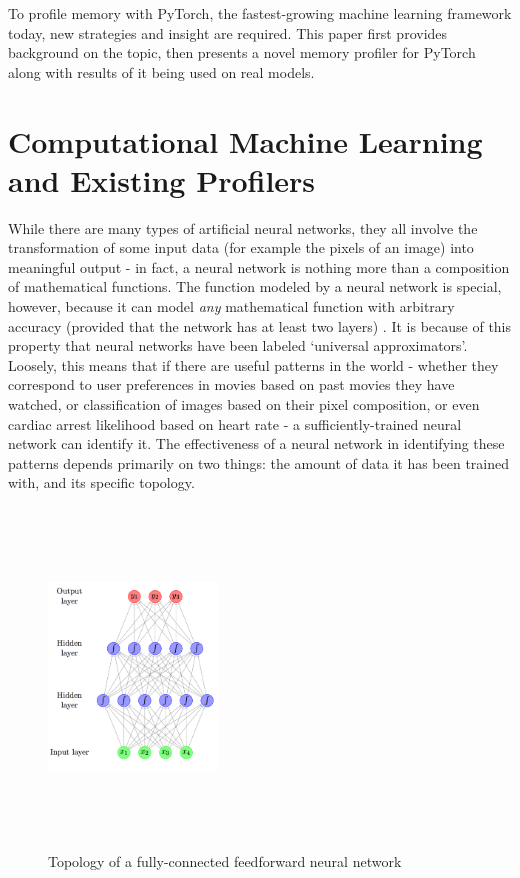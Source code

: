 \documentclass[12pt,letterpaper]{article}
\begin{document}
To profile memory with PyTorch, the fastest-growing machine learning framework today, new strategies and insight are required. This paper first provides background on the topic, then presents a novel memory profiler for PyTorch along with results of it being used on real models. \par 
\newpage

\section{Computational Machine Learning and Existing Profilers}
While there are many types of artificial neural networks, they all involve the transformation of some input data (for example the pixels of an image) into meaningful output - in fact, a neural network is nothing more than a composition of mathematical functions. The function modeled by a neural network is special, however, because it can model \textit{any} mathematical function with arbitrary accuracy (provided that the network has at least two layers) \cite{dnn_history}. It is because of this property that neural networks have been labeled \enquote*{universal approximators}. Loosely, this means that if there are useful patterns in the world - whether they correspond to user preferences in movies based on past movies they have watched, or classification of images based on their pixel composition, or even cardiac arrest likelihood based on heart rate - a sufficiently-trained neural network can identify it. The effectiveness of a neural network in identifying these patterns depends primarily on two things: the amount of data it has been trained with, and its specific topology.
\par

\begin{figure}[h]
\centering
\includegraphics[width=0.4\textwidth,height=9cm]{neural_network_machinelearningmastery.png}
\captionsetup{width=0.7\linewidth}
\caption{ Topology of a fully-connected feedforward neural network \cite{feedforward_pic}}
\label{fig:feedforwardNN}
\end{figure}
\end{document}

